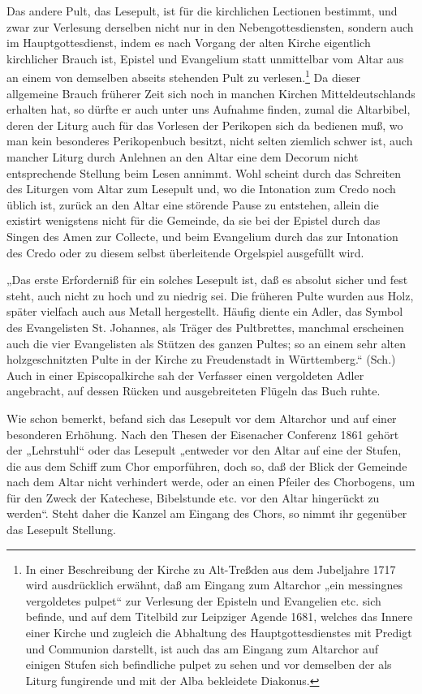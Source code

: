Das andere Pult, das Lesepult, ist für die kirchlichen Lectionen bestimmt, und zwar zur Verlesung derselben nicht nur in den Nebengottesdiensten, sondern auch im Hauptgottesdienst, indem es nach Vorgang der alten Kirche eigentlich kirchlicher Brauch ist, Epistel und Evangelium statt unmittelbar vom Altar aus an einem von demselben abseits stehenden Pult zu verlesen.\footnote{In einer Beschreibung der Kirche zu Alt-Treßden aus dem Jubeljahre 1717 wird ausdrücklich erwähnt, daß am Eingang zum Altarchor „ein messingnes vergoldetes pulpet“ zur Verlesung der Episteln und Evangelien etc. sich befinde, und auf dem Titelbild zur Leipziger Agende 1681, welches das Innere einer Kirche und zugleich die Abhaltung des Hauptgottesdienstes mit Predigt und Communion darstellt, ist auch das am Eingang zum Altarchor auf einigen Stufen sich befindliche pulpet zu sehen und vor demselben der als Liturg fungirende und mit der Alba bekleidete Diakonus.} Da dieser allgemeine Brauch früherer Zeit sich noch in manchen Kirchen Mitteldeutschlands erhalten hat, so dürfte er auch unter uns Aufnahme finden, zumal die Altarbibel, deren der Liturg auch für das Vorlesen der Perikopen sich da bedienen muß, wo man kein besonderes Perikopenbuch besitzt, nicht selten ziemlich schwer ist, auch mancher Liturg durch Anlehnen an den Altar eine dem Decorum nicht entsprechende Stellung beim Lesen annimmt. Wohl scheint durch das Schreiten des Liturgen vom Altar zum Lesepult und, wo die Intonation zum Credo noch üblich ist, zurück an den Altar eine störende Pause zu entstehen, allein die existirt wenigstens nicht für die Gemeinde, da sie bei der Epistel durch das Singen des Amen zur Collecte, und beim Evangelium durch das zur Intonation des Credo oder zu diesem selbst überleitende Orgelspiel ausgefüllt wird.

„Das erste Erforderniß für ein solches Lesepult ist, daß es absolut sicher und fest steht, auch nicht zu hoch und zu niedrig sei. Die früheren Pulte wurden aus Holz, später vielfach auch aus Metall hergestellt. Häufig diente ein Adler, das Symbol des Evangelisten St. Johannes, als Träger des Pultbrettes, manchmal erscheinen auch die vier Evangelisten als Stützen des ganzen Pultes; so an einem sehr alten holzgeschnitzten Pulte in der Kirche zu Freudenstadt in Württemberg.“ (Sch.) Auch in einer Episcopalkirche sah der Verfasser einen vergoldeten Adler angebracht, auf dessen Rücken und ausgebreiteten Flügeln das Buch ruhte.

Wie schon bemerkt, befand sich das Lesepult vor dem Altarchor und auf einer besonderen Erhöhung. Nach den Thesen der Eisenacher Conferenz 1861 gehört der „Lehrstuhl“ oder das Lesepult „entweder vor den Altar auf eine der Stufen, die aus dem Schiff zum Chor emporführen, doch so, daß der Blick der Gemeinde nach dem Altar nicht verhindert werde, oder an einen Pfeiler des Chorbogens, um für den Zweck der Katechese, Bibelstunde etc. vor den Altar hingerückt zu werden“. Steht daher die Kanzel am Eingang des Chors, so nimmt ihr gegenüber das Lesepult Stellung.

